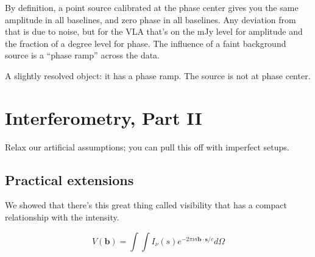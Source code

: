 \documentclass[a4paper]{article}
\begin{document}
By definition, a point source calibrated at the phase center gives you the same amplitude in all baselines, and zero phase in all baselines. Any deviation from that is due to noise, but for the VLA that's on the mJy level for amplitude and the fraction of a degree level for phase. The influence of a faint background source is a ``phase ramp'' across the data. 

A slightly resolved object: it has a phase ramp. The source is not at phase center.

\section{Interferometry, Part II}

Relax our artificial assumptions; you can pull this off with imperfect setups. 

\subsection{Practical extensions}

We showed that there's this great thing called visibility that has a compact relationship with the intensity. 

\begin{equation}
V(\mathbf{b}) = \int \int I_\nu (s) e^{-2\pi\nu i \mathbf{b} \cdot \mathbf{s} / c} d\Omega
\end{equation}
\end{document}

